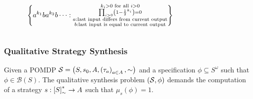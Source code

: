 \documentclass{beamer}
\begin{document}
\begin{frame}
\begin{onlyenv}
      \begin{columns}
        \begin{column}{0.5\textwidth}
          \begin{equation*}
            \left\{
              a^{k_{1}}ba^{k_{2}}b\dots:
              \substack{k_{i}>0\text{ for all }i>0\\
              \prod_{i>0}\left(1-\frac{1}{2}^{k_{i}}\right) = 0\\
              a:\text{last input differs from current output}\\
              b:\text{last input is equal to current output}}
            \right\}
          \end{equation*}
          \begin{center}
          \end{center}
        \end{column}
        \begin{column}{0.5\textwidth}
          \begin{center}
          \end{center}
        \end{column}
      \end{columns}
    \end{onlyenv}
  \end{frame}

  \begin{frame}
    \frametitle{Qualitative Strategy Synthesis}
    \begin{definition}
      Given a \ac{POMDP} $\mathcal{S} = \left(S, s_{0}, A,
      \left(\tau_{a}\right)_{a\in A}, \sim\right)$ and a specification $\phi\subseteq
      S^{\omega}$ such that $\phi\in\mathcal{B}(S)$. The qualitative synthesis
      problem $\left(\mathcal{S}, \phi\right)$ demands the computation of a strategy
      $s:\left[S\right]_{\sim}^{*}\rightarrow A$ such that $\mu_{s}(\phi) = 1$.
    \end{definition}
  \end{frame}
\end{document}
